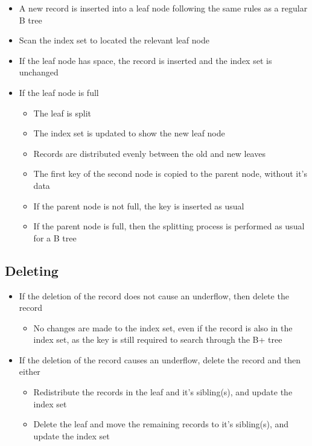\begin{itemize}
  \item A new record is inserted into a leaf node following the same rules as a regular B tree
  \item Scan the index set to located the relevant leaf node
  \item If the leaf node has space, the record is inserted and the index set is unchanged
  \item If the leaf node is full
  \begin{itemize}
    \item The leaf is split
    \item The index set is updated to show the new leaf node
    \item Records are distributed evenly between the old and new leaves
    \item The first key of the second node is copied to the parent node, without it's data
    \item If the parent node is not full, the key is inserted as usual
    \item If the parent node is full, then the splitting process is performed as usual for a B tree
  \end{itemize}
\end{itemize}

\subsection*{Deleting}

\begin{itemize}
  \item If the deletion of the record does not cause an underflow, then delete the record
  \begin{itemize}
    \item No changes are made to the index set, even if the record is also in the index set, as the key is still required to search through the B+ tree
  \end{itemize}
  \item If the deletion of the record causes an underflow, delete the record and then either
  \begin{itemize}
    \item Redistribute the records in the leaf and it's sibling(s), and update the index set
    \item Delete the leaf and move the remaining records to it's sibling(s), and update the index set
  \end{itemize}
\end{itemize}

